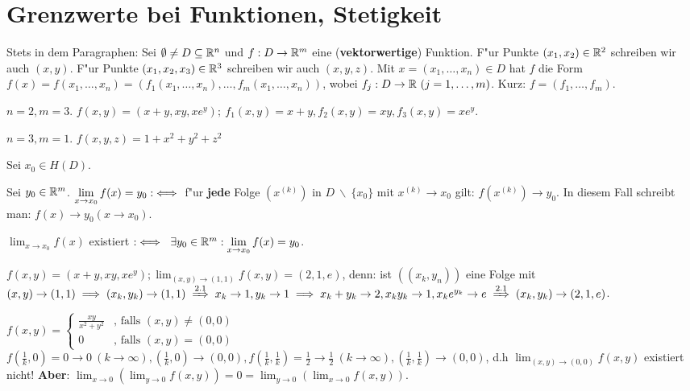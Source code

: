 \documentclass[a4paper,twoside,DIV15,BCOR12mm,chapterprefix=true,headings=twolinechapter]{scrbook}
\begin{document}
\chapter{Grenzwerte bei Funktionen, Stetigkeit}

\begin{vereinbarung}
Stets in dem Paragraphen: Sei $\emptyset \ne D \subseteq \mathbb{R}^n$ und $f: D\to\mathbb{R}^m$ eine (\textbf{vektorwertige}) Funktion. F"ur Punkte $(x_1, x_2) \in \mathbb{R}^2$ schreiben wir auch $(x,y)$. F"ur Punkte $(x_1, x_2, x_3) \in\mathbb{R}^3$ schreiben wir auch $(x, y, z)$. Mit $x=(x_1,\ldots,x_n)\in D$ hat $f$ die Form $f(x)=f(x_1,\ldots,x_n)=(f_1(x_1,\ldots,x_n),\ldots,f_m(x_1,\ldots,x_n))$, wobei $f_j:D\to\mathbb{R}\ (j=1,\ldots,m)$. Kurz: $f=(f_1,\ldots,f_m)$.
\end{vereinbarung}

\begin{beispiele}
\item $n=2,m=3$. $f(x,y)=(x+y,xy,xe^y);\ f_1(x,y)=x+y, f_2(x,y)=xy, f_3(x,y)=xe^y$.
\item $n=3,m=1$. $f(x,y,z)=1+x^2+y^2+z^2$
\end{beispiele}

\begin{definition*}
Sei $x_0\in H(D)$.

\begin{liste}
\item Sei $y_0 \in \mathbb{R}^m$. $\displaystyle\lim_{x\to x_0}f(x)=y_0 :\iff$ f"ur \textbf{jede} Folge $(x^{(k)})$ in $D\ \backslash\ \{x_0\}$ mit $x^{(k)}\to x_0$ gilt: $f(x^{(k)})\to y_0$. In diesem Fall schreibt man: $f(x)\to y_0(x\to x_0)$.
\item $\displaystyle\lim_{x\to x_0}f(x)$ existiert $:\iff\ \exists y_0 \in \mathbb{R}^m: \displaystyle\lim_{x\to x_0}f(x)=y_0$.
\end{liste}
\end{definition*}

\begin{beispiele}
\item $f(x,y)=(x+y,xy,xe^y); \displaystyle\lim_{(x,y)\to(1,1)}f(x,y)=(2,1,e)$, denn: ist $((x_k, y_n))$ eine Folge mit $(x,y)\to(1,1)\folgt (x_k,y_k)\to(1,1)\folgtnach{2.1}x_k\to 1, y_k\to 1 \folgt x_k+y_k\to 2, x_ky_k\to 1, x_ke^{y_k}\to e\folgtnach{2.1}(x_k,y_k)\to(2,1,e)$.
\item $f(x,y)=\begin{cases}
\frac{xy}{x^2+y^2}&\text{, falls }(x,y)\ne(0,0)\\
0&\text{, falls }(x,y)=(0,0)
\end{cases}$\\
$f(\frac{1}{k},0)=0\to 0\ (k\to \infty), (\frac{1}{k},0)\to(0,0), f(\frac{1}{k},\frac{1}{k})=\frac{1}{2}\to\frac{1}{2}\ (k\to \infty), (\frac{1}{k},\frac{1}{k})\to(0,0)$, d.h $\displaystyle\lim_{(x,y)\to(0,0)}f(x,y)$ existiert nicht! \textbf{Aber}: $\displaystyle\lim_{x\to 0}(\displaystyle\lim_{y\to 0} f(x,y))=0=\displaystyle\lim_{y\to 0}(\displaystyle\lim_{x\to 0} f(x,y))$.
\end{beispiele}
\end{document}
